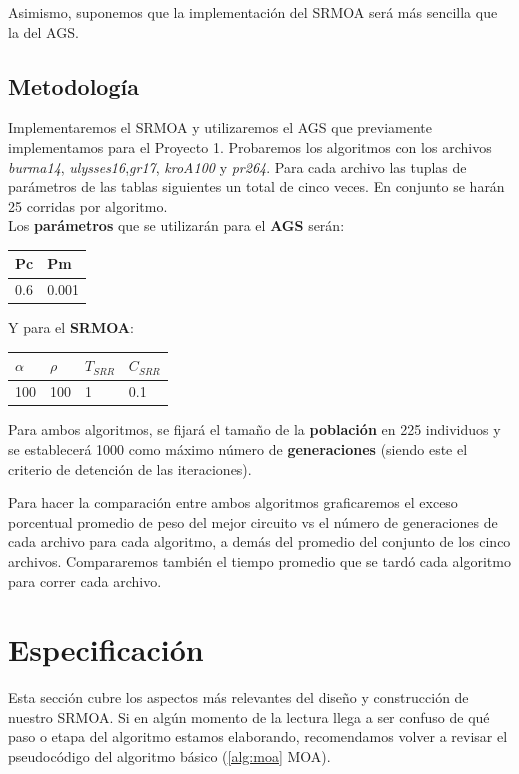 \documentclass[12pt]{article}
\begin{document}
Asimismo, suponemos que la implementación del SRMOA será más sencilla que la del AGS.
\subsection*{Metodología}\label{sec:met}
Implementaremos el SRMOA y utilizaremos el AGS que previamente implementamos para el Proyecto 1. Probaremos los algoritmos con los archivos \textit{burma14}, \textit{ulysses16},\textit{gr17}, \textit{kroA100} y \textit{pr264}. Para cada archivo las tuplas de parámetros de las tablas siguientes un total de cinco veces. En conjunto se harán 25 corridas por algoritmo.\\


Los \textbf{parámetros} que se utilizarán para el \textbf{AGS} serán:
\begin{center}
\begin{tabularx}{0.25\textwidth}{|X|X|}
  \hline
\textbf{Pc} &  \textbf{Pm} \\ \hline
0.6 & 0.001 \\ \hline
\end{tabularx}
\end{center}

Y para el \textbf{SRMOA}:
\begin{center}
\begin{tabularx}{0.30\textwidth}{|X|X|X|X|}
  \hline
\textbf{$\alpha$} &  \textbf{$\rho$} & \textbf{$T_{SRR}$} & \textbf{$C_{SRR}$}\\ \hline
100 & 100 & 1 & 0.1 \\ \hline
\end{tabularx}
\end{center}

Para ambos algoritmos, se fijará el tamaño de la \textbf{población} en 225 individuos y se establecerá 1000 como máximo número de \textbf{generaciones} (siendo este el criterio de detención de las iteraciones).

Para hacer la comparación entre ambos algoritmos graficaremos el exceso porcentual promedio de peso del mejor circuito vs el número de generaciones de cada archivo para cada algoritmo, a demás del promedio del conjunto de los cinco archivos. Compararemos también el tiempo promedio que se tardó cada algoritmo para correr cada archivo.

\newpage

\section{Especificación}\label{sec:esp}
Esta sección cubre los aspectos más relevantes del diseño y construcción
de nuestro SRMOA. Si en algún momento de la lectura llega a ser confuso
de qué paso o etapa del algoritmo estamos elaborando, recomendamos volver a revisar el pseudocódigo del algoritmo básico (\ref{alg:moa} MOA).
\end{document}
